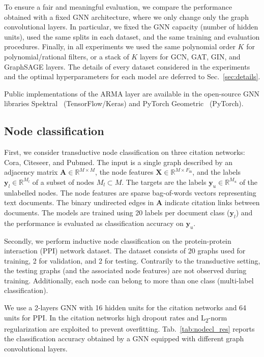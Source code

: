 \documentclass{article}
\begin{document}
To ensure a fair and meaningful evaluation, we compare the performance obtained with a fixed GNN architecture, where we only change only the graph convolutional layers.
In particular, we fixed the GNN capacity (number of hidden units), used the same splits in each dataset, and the same training and evaluation procedures.
Finally, in all experiments we used the same polynomial order $K$ for polynomial/rational filters, or a stack of $K$ layers for GCN, GAT, GIN, and GraphSAGE layers.
The details of every dataset considered in the experiments and the optimal hyperparameters for each model are deferred to Sec.~\ref{sec:details}.

Public implementations of the ARMA layer are available in the open-source GNN libraries Spektral~\cite{grattarola2020graph} (TensorFlow/Keras) and PyTorch Geometric~\cite{fey2019fast} (PyTorch).

\subsection{Node classification}
First, we consider transductive node classification on three citation networks: Cora, Citeseer, and Pubmed. 
The input is a single graph described by an adjacency matrix $\mathbf{A} \in \mathbb{R}^{M \times M}$, the node features $\mathbf{X} \in \mathbb{R}^{M \times F_\text{in}}$, and the labels $\mathbf{y}_l \in \mathbb{R}^{M_l}$ of a subset of nodes $M_l \subset M$. 
The targets are the labels $\mathbf{y}_u \in \mathbb{R}^{M_u}$ of the unlabelled nodes.
The node features are sparse bag-of-words vectors representing text documents. 
The binary undirected edges in $\mathbf{A}$ indicate citation links between documents.
The models are trained using 20 labels per document class ($\mathbf{y}_l$) and the performance is evaluated as classification accuracy on $\mathbf{y}_u$.

Secondly, we perform inductive node classification on the protein-protein interaction (PPI) network dataset.
The dataset consists of 20 graphs used for training, 2 for validation, and 2 for testing. 
Contrarily to the transductive setting, the testing graphs (and the associated node features) are not observed during training. 
Additionally, each node can belong to more than one class (multi-label classification).

We use a 2-layers GNN with 16 hidden units for the citation networks and 64 units for PPI. 
In the citation networks high dropout rates and L\textsubscript{2}-norm regularization are exploited to prevent overfitting. 
Tab.~\ref{tab:nodecl_res} reports the classification accuracy obtained by a GNN equipped with different graph convolutional layers.
\end{document}

